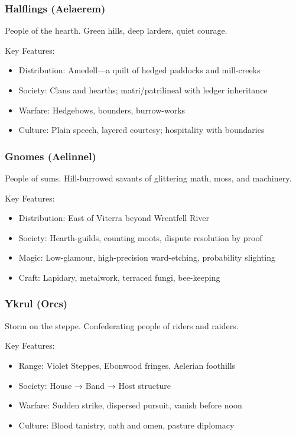 \subsubsection{Halflings (Aelaerem)}
\label{sec:halflings}

People of the hearth. Green hills, deep larders, quiet courage.

Key Features:
\begin{itemize}
    \item Distribution: Amedell—a quilt of hedged paddocks and mill-creeks
    \item Society: Clans and hearths; matri/patrilineal with ledger inheritance
    \item Warfare: Hedgebows, bounders, burrow-works
    \item Culture: Plain speech, layered courtesy; hospitality with boundaries
\end{itemize}

\subsubsection{Gnomes (Aelinnel)}
\label{sec:gnomes}

People of sums. Hill-burrowed savants of glittering math, moss, and machinery.

Key Features:
\begin{itemize}
    \item Distribution: East of Viterra beyond Wrentfell River
    \item Society: Hearth-guilds, counting moots, dispute resolution by proof
    \item Magic: Low-glamour, high-precision ward-etching, probability slighting
    \item Craft: Lapidary, metalwork, terraced fungi, bee-keeping
\end{itemize}

\subsubsection{Ykrul (Orcs)}
\label{sec:ykrulpeoples}

Storm on the steppe. Confederating people of riders and raiders.

Key Features:
\begin{itemize}
    \item Range: Violet Steppes, Ebonwood fringes, Aelerian foothills
    \item Society: House → Band → Host structure
    \item Warfare: Sudden strike, dispersed pursuit, vanish before noon
    \item Culture: Blood tanistry, oath and omen, pasture diplomacy
\end{itemize}

